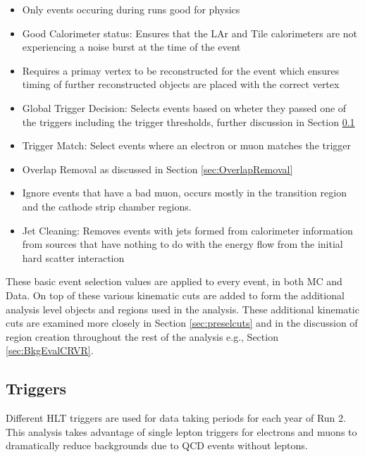 \begin{itemize}
\item Only events occuring during runs good for physics
\item Good Calorimeter status: Ensures that the LAr and Tile calorimeters are not experiencing a noise burst at the time of the event
\item Requires a primay vertex to be reconstructed for the event which ensures timing of further reconstructed objects are placed with the correct vertex
\item Global Trigger Decision: Selects events based on wheter they passed one of the triggers including the trigger thresholds, further discussion in Section \ref{sec:GTRIGDEC}
\item Trigger Match: Select events where an electron or muon matches the trigger
\item Overlap Removal as discussed in Section \ref{sec:OverlapRemoval}
\item Ignore events that have a bad muon, occurs mostly in the transition region and the cathode strip chamber regions.
\item Jet Cleaning: Removes events with jets formed from calorimeter information from sources that have nothing to do with the energy flow from the initial hard scatter interaction
\end{itemize}

These basic event selection values are applied to every event, in both MC and Data.  On top of these various kinematic cuts are added to form the additional analysis level objects and regions used in the analysis.  These additional kinematic cuts are examined more closely in Section \ref{sec:preselcuts} and in the discussion of region creation throughout the rest of the analysis e.g., Section \ref{sec:BkgEvalCRVR}.


\subsection{Triggers}
\label{sec:GTRIGDEC}
Different HLT triggers are used for data taking periods for each year of Run 2.  This analysis takes advantage of single lepton triggers for electrons and muons to dramatically reduce backgrounds due to QCD events without leptons.  

